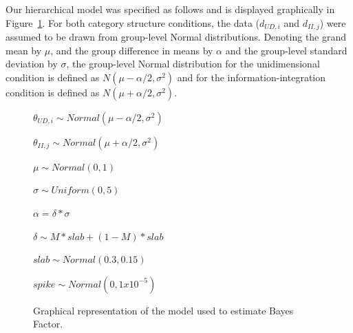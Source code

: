 \documentclass[12pt]{article}
\begin{document}
Our hierarchical model was specified as follows and is displayed graphically in Figure~\ref{fig:BayesianModel}. For both category structure conditions, the data ($d_{UD,i}$ and $d_{II,j}$) were assumed to be drawn from group-level Normal distributions. Denoting the grand mean by $\mu$, and the group difference in means by $\alpha$ and the group-level standard deviation by $\sigma$, the group-level Normal distribution for the unidimensional condition is defined as $N(\mu-\alpha/2, \sigma^2)$ and for the information-integration condition is defined as $N(\mu+\alpha/2, \sigma^2)$.

\begin{figure}
  \begin{minipage}{0.4\textwidth}
  \end{minipage}
  \begin{minipage}{0.1\textwidth}
  	\hspace{1cm}
  \end{minipage}
  \begin{minipage}{0.4\textwidth}
  	$\theta_{UD, i} \sim Normal(\mu-\alpha/2, \sigma^2)$
  	
  	\vspace{20pt} 
  	
  	$\theta_{II, j} \sim Normal(\mu+\alpha/2, \sigma^2)$	
  	
  	\vspace{20pt}
  	$\mu \sim Normal(0, 1)$
  	
  	$\sigma \sim Uniform(0, 5)$
  	
  	$\alpha = \delta * \sigma$
  	
  	$\delta \sim M*slab + (1-M)*slab$
  	
  	$slab \sim Normal(0.3, 0.15)$
  	
  	$spike \sim Normal(0, 1x10^{-5})$
  	
  	
  \end{minipage}
  \caption{Graphical representation of the model used to estimate Bayes Factor.}
  \label{fig:BayesianModel}
\end{figure}
\end{document}

